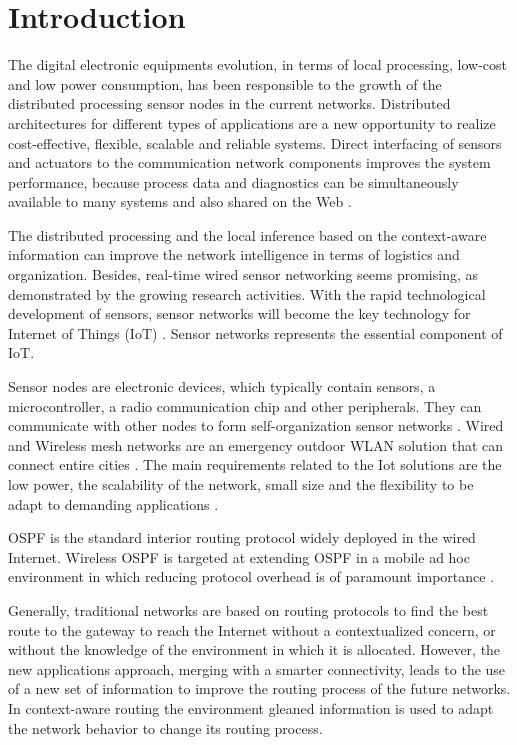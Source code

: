 
\section{Introduction}
The digital electronic equipments evolution, in terms of local processing, low-cost and low power consumption, has been responsible to the growth of the distributed processing sensor nodes in the current networks. Distributed architectures for different types of applications are a new opportunity to realize cost-effective, flexible, scalable and reliable systems. Direct interfacing of sensors and actuators to the communication network components improves the system performance, because process data and diagnostics can be simultaneously available to many systems and also shared on the Web \cite{Flammini2008}.

The distributed processing and the local inference based on the context-aware information can improve the network intelligence in terms of logistics and organization. Besides, real-time wired sensor networking seems promising, as demonstrated by the growing research activities. With the rapid technological development of sensors, sensor networks will become the key technology for Internet of Things (IoT) \cite{IEC2014}. Sensor networks represents the essential component of IoT.

Sensor nodes are electronic devices, which typically contain sensors, a microcontroller, a radio communication chip and other peripherals. They can communicate with other nodes to form self-organization sensor networks \cite{Son2009}. Wired and Wireless mesh networks are an emergency outdoor WLAN solution that can connect entire cities \cite{Akyildiz2009}. The main requirements related to the Iot solutions are the low power, the scalability of the network, small size and the flexibility to be adapt to demanding applications \cite{Leon2015}.

OSPF is the standard interior routing protocol widely deployed in the wired Internet. Wireless OSPF is targeted at extending OSPF in a mobile ad hoc environment in which reducing protocol overhead is of paramount importance \cite{Holter2010}.

Generally, traditional networks are based on routing protocols to find the best route to the gateway to reach the Internet without a contextualized concern, or without the knowledge of the environment in which it is allocated. However, the new applications approach, merging with a smarter connectivity, leads to the use of a new set of information to improve the routing process of the future networks. In context-aware routing the environment gleaned information is used to adapt the network behavior to change its routing process.

